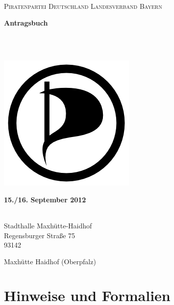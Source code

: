\documentclass[12pt,a4paper,oneside]{scrbook}
\newcommand{\lpt}{
	Landesparteitag Bayern 2012.2
}
\newcommand{\datum}{
	15./16. September 2012
}
\newcommand{\halle}{
	Stadthalle Maxhütte-Haidhof
}
\newcommand{\strasse}{
	Regensburger Straße 75
}
\newcommand{\plz}{
	93142
}
\newcommand{\ort}{
	Maxhütte Haidhof (Oberpfalz)
}
\begin{document}

\pagestyle{empty}
\hypertarget{Titelseite}{} %
\begin{titlepage}
\begin{Large}
\textsc{
Piratenpartei Deutschland Landesverband Bayern
}
\end{Large}
\vspace*{4cm}
\begin{center}
\begin{Huge}
\textbf{
Antragsbuch
}
\end{Huge}
\\[.5cm]
\begin{huge}
\textbf{
\lpt
}
\end{huge}
\\[1cm]
\includegraphics{media/PIRATENsignet.png}
\\[1cm]
\begin{Large}
\textbf{\datum}
\end{Large}
\\[1cm]
\halle \\
\strasse \\
\plz \ort
\end{center}
\end{titlepage}
\clearpage



\tableofcontents
\newpage
\pagestyle{plain}


\chapter{Hinweise und Formalien}



\end{document}

